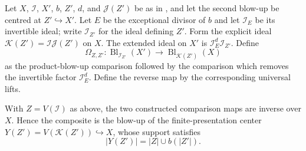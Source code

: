\begin{definition}
  \label{def:nagata-composition-of-blowups-comparison}

  Let $X$, $\mathcal I$, $X'$, $b$, $Z'$, $d$, and $\mathcal J(Z')$ be as in
  , and let the second blow-up be
  centred at $Z'\hookrightarrow X'$.  Let $E$ be the exceptional divisor of
  $b$ and let $\mathcal I_E$ be its invertible ideal; write
  $\mathcal I_{Z'}$ for the ideal defining $Z'$.  Form the explicit ideal
  $\mathcal K(Z')=\mathcal I\mathcal J(Z')$ on $X$.  The extended ideal on
  $X'$ is $\mathcal I_E^d\mathcal I_{Z'}$.  Define
  \[
    \Omega_{Z,Z'}\colon
      \operatorname{Bl}_{\mathcal I_{Z'}}(X')
      \longrightarrow
      \operatorname{Bl}_{\mathcal K(Z')}(X)
  \]
  as the product-blow-up comparison followed by the comparison which removes
  the invertible factor $\mathcal I_E^d$.  Define the reverse map by the
  corresponding universal lifts.
\end{definition}

\begin{theorem}
  \label{thm:nagata-composition-of-blowups}

  With $Z=V(\mathcal I)$ as above, the two constructed comparison maps are
  inverse over $X$.  Hence the
  composite is the blow-up of the finite-presentation center
  $Y(Z')=V(\mathcal K(Z'))\hookrightarrow X$, whose support satisfies
  \[
    |Y(Z')|=|Z|\cup b(|Z'|).
  \]
\end{theorem}

